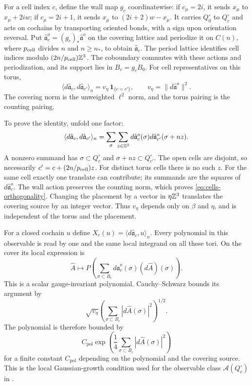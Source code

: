 For a cell index $c$, define the wall map $g_c$ coordinatewise:
if $c_\mu=2i$, it sends $x_\mu$ to $x_\mu+2iw$; if
$c_\mu=2i+1$, it sends $x_\mu$ to $(2i+2)w-x_\mu$.
It carries $Q_0^\circ$ to $Q_c^\circ$ and acts on cochains by
transporting oriented bonds, with a sign upon orientation reversal. Put
$\hat{\mathfrak a}_c^o=(g_c)_*\hat{\mathfrak a}^o$ on the
covering lattice and periodize it on $C(n)$, where $p_{\rm cell}$ divides
$n$ and $n\ge n_*$, to obtain $\hat{\mathfrak a}_c$.
The period lattice identifies cell indices modulo
$(2n/p_{\rm cell})\mathbb Z^3$. The coboundary commutes with these actions
and periodization, and its support lies in $B_c=g_cB_0$.
For cell representatives on this torus,
\begin{equation}\label{eq:cells-orthogonality}
 \langle d\hat{\mathfrak a}_c,d\hat{\mathfrak a}_{c'}\rangle_n
             =v_\eta\,\mathbf1_{\{c=c'\}},\qquad
 v_\eta=\|d\hat{\mathfrak a}^o\|^2.
\end{equation}
The covering norm is the unweighted $\ell^2$ norm, and the
torus pairing is the counting pairing.

To prove the identity, unfold one factor:
\[
 \langle d\hat{\mathfrak a}_c,d\hat{\mathfrak a}_{c'}\rangle_n
  =\sum_{\sigma}\sum_{z\in\mathbb Z^3}
       d\hat{\mathfrak a}_c^o(\sigma)
       d\hat{\mathfrak a}_{c'}^o(\sigma+nz).
\]
A nonzero summand has $\sigma\subset Q_c^\circ$ and
$\sigma+nz\subset Q_{c'}^\circ$. The open cells are disjoint,
so necessarily $c'=c+(2n/p_{\rm cell})z$. For distinct torus cells
there is no such $z$. For the same cell exactly one translate
can contribute; its summands are the squares of
$d\hat{\mathfrak a}_c^o$. The wall action preserves the
counting norm, which proves \eqref{eq:cells-orthogonality}.
Changing the placement by a vector in $\eta\mathbb Z^3$ translates
the covering source by an integer vector. Thus $v_\eta$
depends only on $\beta$ and $\eta$, and is independent of
the torus and the placement.

For a closed cochain $u$ define
$X_c(u)=\langle d\hat{\mathfrak a}_c,u\rangle_n$.
Every polynomial in this observable is read by one and the
same local integrand on all these tori. On the cover its
local expression is
\[
 \widehat A\longmapsto
 P\left(\sum_{\sigma\subset B_c}
             d\hat{\mathfrak a}_c^o(\sigma)(d\widehat A)(\sigma)\right).
\]
This is a scalar gauge-invariant polynomial. Cauchy--Schwarz
bounds its argument by
\[
 \sqrt{v_\eta}\left(\sum_{\sigma\subset B_c}
                      |d\widehat A(\sigma)|^2\right)^{1/2}.
\]
The polynomial is therefore bounded by
\[
 C_{\mathrm{pol}}\exp\left(\frac14\sum_{\sigma\subset B_c}
                                      |d\widehat A(\sigma)|^2\right)
\]
for a finite constant $C_{\mathrm{pol}}$ depending on the polynomial
and the covering source. This is the local Gaussian-growth condition used for the
observable class $\mathcal A(Q_c^\circ)$ in \cite[\S4.1, (46)]{ChamberLattice}.

